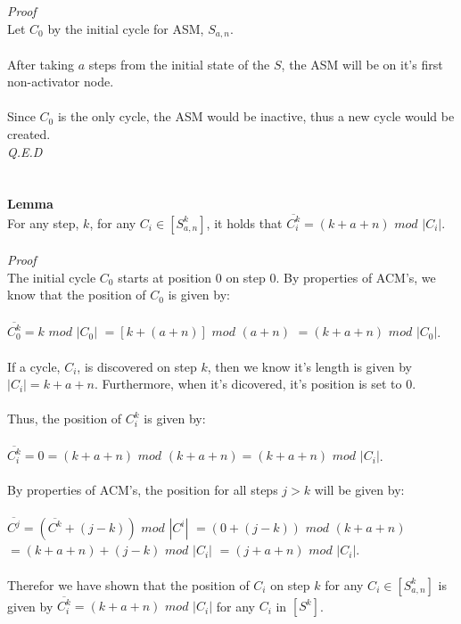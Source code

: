 \documentclass[a4paper,12pt]{article}
\begin{document}
\textit{Proof}\\
Let $C_0$ by the initial cycle for ASM, $S_{a,n}$.\\
\\
After taking $a$ steps from the initial state of the $S$, the ASM will be on it's first non-activator node.\\
\\
Since $C_0$ is the only cycle, the ASM would be inactive, thus a new cycle would be created.\\
\textit{Q.E.D}\\
\\ 
\\
\textbf{Lemma}\\
For any step, $k$, for any $C_i \in [S^k_{a,n}]$, it holds that $\overline{C^k_i} = (k + a + n)$ $mod$ $|C_i|$.\\
\\
\textit{Proof}\\  
The initial cycle $C_0$ starts at position $0$ on step $0$. By properties of ACM's, we know that the position of $C_0$ is given by:\\
\\
$\overline{C^k_0} = k$ $mod$ $|C_0| $
$= [k +(a + n)]$ $mod$ $(a + n)$
$= (k + a + n)$ $mod$ $|C_0|$.\\
\\
If a cycle, $C_i$, is discovered on step $k$, then we know it's length is given by $|C_i| = k + a + n$. Furthermore, when it's dicovered, it's position is set to 0.\\
\\
Thus, the position of $C^k_i$ is given by:\\
\\
$\overline{C^k_i} = 0 = (k + a + n)$ $mod$ $(k + a + n) = (k + a + n)$ $mod$ $|C_i|$.\\
\\
By properties of ACM's, the position for all steps $j > k$ will be given by:\\
\\
$\overline{C^j} = (\overline{C^k} + (j - k))$ $mod$ $|C^i|$
$= (0 + (j-k))$ $mod$ $(k + a + n)$\\
$= (k + a +n) + (j-k)$ $mod$ $|C_i| $
$= (j + a + n)$ $mod$ $|C_i|$.\\
\\
Therefor we have shown that the position of $C_i$ on step $k$ for any $C_i \in [S^k_{a,n}]$ is given by $\overline{C^k_i} = (k + a + n)$ $mod$ $|C_i|$ for any $C_i$ in $[S^k]$.\\
\end{document}
